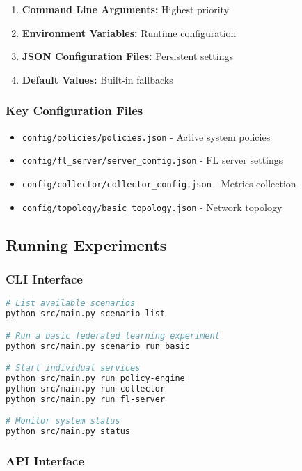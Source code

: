 \documentclass[12pt,a4paper,twoside]{article}
\newcommand{\code}[1]{\texttt{#1}}
\begin{document}
\begin{enumerate}
    \item \textbf{Command Line Arguments:} Highest priority
    \item \textbf{Environment Variables:} Runtime configuration
    \item \textbf{JSON Configuration Files:} Persistent settings
    \item \textbf{Default Values:} Built-in fallbacks
\end{enumerate}

\subsubsection{Key Configuration Files}

\begin{itemize}
    \item \code{config/policies/policies.json} - Active system policies
    \item \code{config/fl\_server/server\_config.json} - FL server settings
    \item \code{config/collector/collector\_config.json} - Metrics collection
    \item \code{config/topology/basic\_topology.json} - Network topology
\end{itemize}

\subsection{Running Experiments}

\subsubsection{CLI Interface}

\begin{lstlisting}[language=bash, caption=CLI Commands]
# List available scenarios
python src/main.py scenario list

# Run a basic federated learning experiment
python src/main.py scenario run basic

# Start individual services
python src/main.py run policy-engine
python src/main.py run collector
python src/main.py run fl-server

# Monitor system status
python src/main.py status
\end{lstlisting}

\subsubsection{API Interface}
\end{document}
